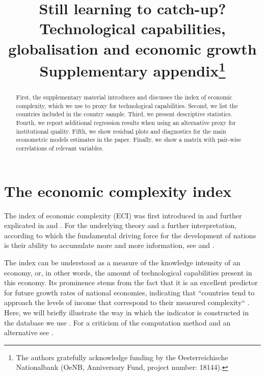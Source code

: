 \documentclass[abstract=on]{scrartcl}
\begin{document}
\date{}

\title{
Still learning to catch-up?\\
Technological capabilities, globalisation and economic growth\\
Supplementary appendix\thanks{The authors gratefully acknowledge funding by the Oesterreichische Nationalbank (OeNB,  Anniversary Fund, project number: 18144).}
}


\maketitle
\begin{abstract}
First, the supplementary material introduces and discusses the index of economic complexity, which we use to proxy for technological capabilities. Second, we list the countries included in the country sample. Third, we present descriptive statistics. Fourth, we report additional regression results when using an alternative proxy for institutional quality. Fifth, we show residual plots and diagnostics for the main econometric models estimates in the paper. Finally, we show a matrix with pair-wise correlations of relevant variables.
\end{abstract}

\newpage

\appendix

\newpage
\section{The economic complexity index}
\label{ap:eci}
The index of economic complexity (ECI) was first introduced in \citet{Hidalgo:2007cp} and further explicated in \citet{Hidalgo:2009be} and \citet{Hausmann:2013vj}.
For the underlying theory and a further interpretation, according to which the fundamental driving force for the development of nations is their ability to accumulate more and more information, see \citet{TheEconomicComplex:2011tp} and \citet{Hidalgo:2015vs}.

The index can be understood as a measure of the knowledge intensity of an economy, or, in other words, the amount of technological capabilities present in this economy. 
Its prominence stems from the fact that it is an excellent predictor for future growth rates of national economies, indicating that ``countries tend to approach the levels of income that correspond to their measured complexity`` \citep[p. 10574]{Hidalgo:2009be}.
Here, we will briefly illustrate the way in which the indicator is constructed in the database we use \citep{TheEconomicComplex:2011tp}.
For a criticism of the computation method and an alternative see \citet{Cristelli:2013hj}.
\end{document}
